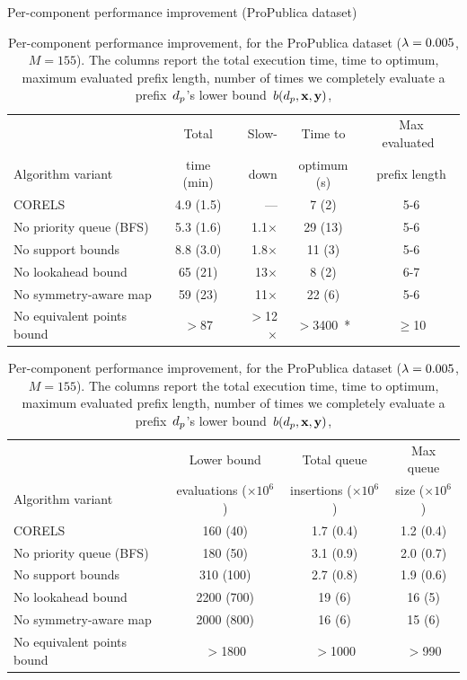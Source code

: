 \begin{table}[t!]
\begin{centering}
Per-component performance improvement (ProPublica dataset) \\
\end{centering}
\vspace{1mm}
\begin{tabular}{l | c  r | c | c}
& Total & Slow- & Time to & Max evaluated~ \\
Algorithm variant & time (min) & down & optimum (s) & prefix length \\
\hline
CORELS & 4.9 (1.5) & --- & 7 (2) & 5-6 \\
No priority queue (BFS) & 5.3 (1.6) & 1.1$\times$ & 29 (13) & 5-6 \\
No support bounds & 8.8 (3.0) & 1.8$\times$ & 11 (3) & 5-6 \\
No lookahead bound & 65 (21) & 13$\times$ & 8 (2) & 6-7 \\
No symmetry-aware map & 59 (23) & 11$\times$ & 22 (6) & 5-6 \\
No equivalent points bound & $>$87 & $>$12$\times$ & $>$3400~* & $\ge$10 \\
\hline
\end{tabular}
\begin{tabular}{l | c | c | c}
\hline
 & Lower bound & Total queue &  Max queue \\
Algorithm variant & evaluations ($\times 10^6$) & insertions ($\times 10^6$) & size ($\times 10^6$) \\
\hline
CORELS & 160 (40) & 1.7 (0.4) & 1.2 (0.4) \\
No priority queue (BFS) & 180 (50) & 3.1 (0.9) & 2.0 (0.7) \\
No support bounds & 310 (100) & 2.7 (0.8) & 1.9 (0.6) \\
No lookahead bound & 2200 (700) & 19 (6) & 16 (5) \\
No symmetry-aware map & 2000 (800) & 16 (6) & 15 (6) \\
No equivalent points bound & $>$1800 & $>$1000 & $>$990 \\
\end{tabular}
\caption{Per-component performance improvement, for the ProPublica dataset
(${{\lambda} = 0.005}$, ${M = 155}$).
%
The columns report the total execution time,
time to optimum, maximum evaluated prefix length,
number of times we completely evaluate a prefix~$d_p$'s lower bound~$b(d_p, \mathbf{x}, \mathbf{y})$,
}
\end{table}
